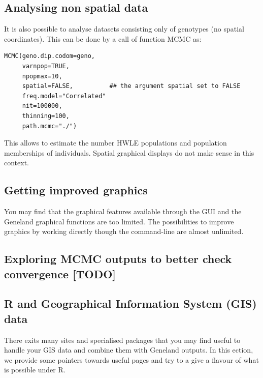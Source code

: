 \documentclass{article}
\begin{document}
\subsection{Analysing non spatial data}

It is also possible to analyse datasets consisting only of genotypes (no spatial coordinates). 
This can be done by  a call of function MCMC as:


\begin{verbatim}
MCMC(geno.dip.codom=geno, 
     varnpop=TRUE, 
     npopmax=10,
     spatial=FALSE,          ## the argument spatial set to FALSE
     freq.model="Correlated"
     nit=100000,
     thinning=100,
     path.mcmc="./")
\end{verbatim}



This allows to estimate the number HWLE populations and population memberships of individuals. 
Spatial graphical displays do not make sense in this context. 

\subsection{Getting improved graphics}
You may find that the graphical features available through the GUI and the {\sc Geneland} graphical functions are too limited. 
The possibilities to improve graphics by working directly though the command-line  are almost unlimited.



\subsection[Convergence checking]{Exploring MCMC outputs to better check convergence  [TODO]}





\subsection[Displaying GIS data]{R and Geographical Information System (GIS) data}

There exits many sites and specialised packages that you may find useful to handle your GIS data and combine them 
with {\sc Geneland} outputs. In this ection, we provide some pointers towards useful pages 
and try to a give a flavour of what is possible under R.
\end{document}
